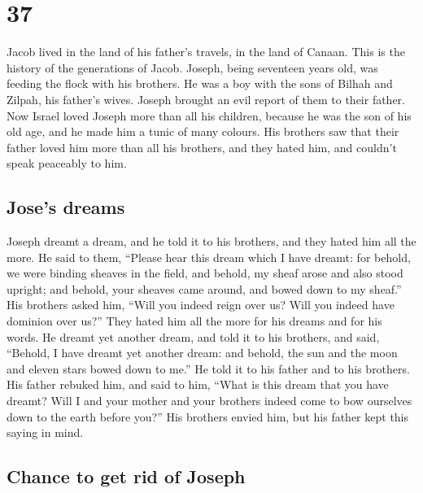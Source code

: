 \hypertarget{section-36}{%
\section{37}\label{section-36}}

 Jacob lived in the land of his father's travels, in the
land of Canaan.  This is the history of the generations of
Jacob. Joseph, being seventeen years old, was feeding the flock with his
brothers. He was a boy with the sons of Bilhah and Zilpah, his father's
wives. Joseph brought an evil report of them to their father.
 Now Israel loved Joseph more than all his children,
because he was the son of his old age, and he made him a tunic of many
colours.  His brothers saw that their father loved him
more than all his brothers, and they hated him, and couldn't speak
peaceably to him.

\hypertarget{joses-dreams}{%
\subsection{Jose's dreams}\label{joses-dreams}}

 Joseph dreamt a dream, and he told it to his brothers,
and they hated him all the more.  He said to them,
``Please hear this dream which I have dreamt:  for behold,
we were binding sheaves in the field, and behold, my sheaf arose and
also stood upright; and behold, your sheaves came around, and bowed down
to my sheaf.''  His brothers asked him, ``Will you indeed
reign over us? Will you indeed have dominion over us?'' They hated him
all the more for his dreams and for his words.  He dreamt
yet another dream, and told it to his brothers, and said, ``Behold, I
have dreamt yet another dream: and behold, the sun and the moon and
eleven stars bowed down to me.''  He told it to his
father and to his brothers. His father rebuked him, and said to him,
``What is this dream that you have dreamt? Will I and your mother and
your brothers indeed come to bow ourselves down to the earth before
you?''  His brothers envied him, but his father kept this
saying in mind.

\hypertarget{chance-to-get-rid-of-joseph}{%
\subsection{Chance to get rid of
Joseph}\label{chance-to-get-rid-of-joseph}}

